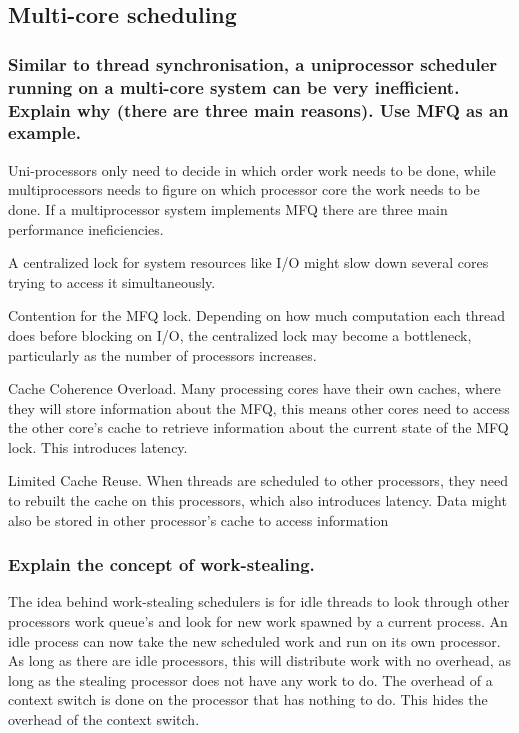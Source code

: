 \documentclass[a4paper]{article}
\begin{document}
\subsection{Multi-core scheduling}

\subsubsection{Similar to thread synchronisation, a uniprocessor scheduler running on a multi-core system can
be very inefficient. Explain why (there are three main reasons). Use MFQ as an example.}

Uni-processors only need to decide in which order work needs to be done, while multiprocessors needs to figure on which processor core the work needs to be done. If a multiprocessor system implements MFQ there are three main performance ineficiencies.

A centralized lock for system resources like I/O might slow down several cores trying to access it simultaneously. 

Contention for the MFQ lock. Depending on how much computation each thread
does before blocking on I/O, the centralized lock may become a bottleneck,
particularly as the number of processors increases.

Cache Coherence Overload. Many processing cores have their own caches, where they will store information about the MFQ, this means other cores need to access the other core's cache to retrieve information about the current state of the MFQ lock. This introduces latency.


Limited Cache Reuse. When threads are scheduled to other processors, they need to rebuilt the cache on this processors, which also introduces latency. Data might also be stored in other processor's cache to access information


\subsubsection{Explain the concept of work-stealing.}

The idea behind work-stealing schedulers is for idle threads to look through other processors work queue's and look for new work spawned by a current process. An idle process can now take the new scheduled work and run on its own processor. As long as there are idle processors, this will distribute work with no overhead, as long as the stealing processor does not have any work to do. The overhead of a context switch is done on the processor that has nothing to do. This hides the overhead of the context switch.
\end{document}

